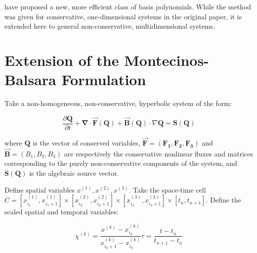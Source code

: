 \documentclass[twoside,english,final,5p,times,twocolumn]{elsarticle}
\begin{document}
\citet{Montecinos2017} have proposed a new, more efficient class
of basis polynomials. While the method was given for conservative,
one-dimensional systems in the original paper, it is extended here
to general non-conservative, multidimensional systems.

\section{Extension of the Montecinos-Balsara Formulation}

Take a non-homogeneous, non-conservative, hyperbolic system of the
form:

\begin{equation}
\frac{\partial\boldsymbol{Q}}{\partial t}+\boldsymbol{\nabla}\cdot\overrightarrow{\boldsymbol{F}}\left(\boldsymbol{Q}\right)+\overrightarrow{\boldsymbol{B}}\left(\boldsymbol{Q}\right)\cdot\nabla\boldsymbol{Q}=\boldsymbol{S}\left(\boldsymbol{Q}\right)\label{eq:system}
\end{equation}

where $\boldsymbol{Q}$ is the vector of conserved variables, $\overrightarrow{\boldsymbol{F}}=\left(\boldsymbol{F_{1},F_{2},F_{3}}\right)$
and $\overrightarrow{\boldsymbol{B}}=\left(B_{1},B_{2},B_{3}\right)$
are respectively the conservative nonlinear fluxes and matrices corresponding
to the purely non-conservative components of the system, and $\boldsymbol{S}\left(\boldsymbol{Q}\right)$
is the algebraic source vector.

Define spatial variables $x^{\left(1\right)},x^{\left(2\right)},x^{\left(3\right)}$.
Take the space-time cell $C=\left[x_{i_{1}}^{\left(1\right)},x_{i_{1}+1}^{\left(1\right)}\right]\times\left[x_{i_{2}}^{\left(2\right)},x_{i_{2}+1}^{\left(2\right)}\right]\times\left[x_{i_{3}}^{\left(3\right)},x_{i_{3}+1}^{\left(3\right)}\right]\times\left[t_{n},t_{n+1}\right]$.
Define the scaled spatial and temporal variables:

\begin{subequations}

\begin{equation}
\chi^{\left(k\right)}=\frac{x^{\left(k\right)}-x_{i_{k}}^{\left(k\right)}}{x_{i_{k}+1}^{\left(k\right)}-x_{i_{k}}^{\left(k\right)}}
\end{equation}

\begin{equation}
\tau=\frac{t-t_{n}}{t_{n+1}-t_{n}}
\end{equation}

\end{subequations}
\end{document}
